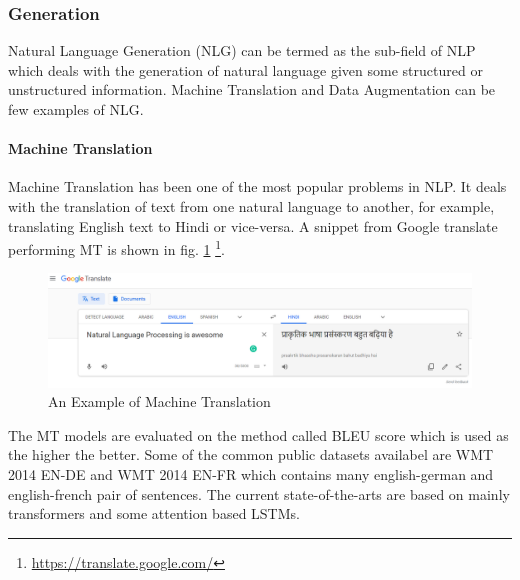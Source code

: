 


\subsubsection{Generation}
Natural Language Generation (NLG) can be termed as the sub-field of NLP which deals with the generation of natural language given some structured or unstructured information. Machine Translation and Data Augmentation can be few examples of NLG.

\paragraph{Machine Translation}
Machine Translation has been one of the most popular problems in NLP. It deals with the translation of text from one natural language to another, for example, translating English text to Hindi or vice-versa. A snippet from Google translate performing MT is shown in fig. \ref{fig:mt_example} \footnote{\url{https://translate.google.com/}}.

\begin{figure}
    \centering
    \includegraphics[width=\textwidth]{images/mt.png}
    \caption{An Example of Machine Translation}
    \label{fig:mt_example}
\end{figure}

The MT models are evaluated on the method called BLEU score which is used as the higher the better. Some of the common public datasets availabel are WMT 2014 EN-DE and WMT 2014 EN-FR \cite{bojar-EtAl:2014:W14-33} which contains many english-german and english-french pair of sentences. The current state-of-the-arts are based on mainly transformers and some attention based LSTMs.


